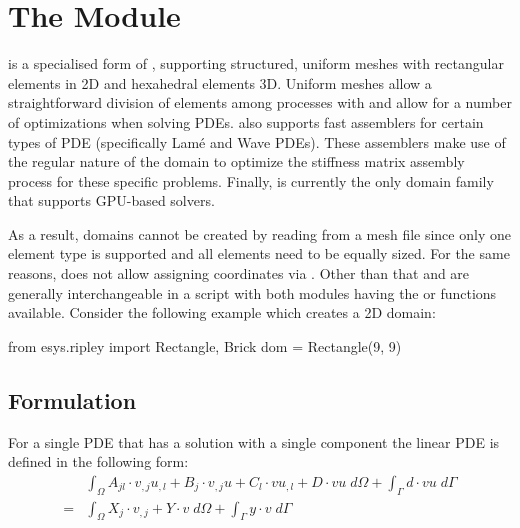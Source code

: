 
%
%
%

\chapter{The \ripley Module}\label{chap:ripley}

\ripley is a specialised form of \finley, supporting structured, 
uniform meshes with rectangular elements in 2D and hexahedral elements 3D.
Uniform meshes allow a straightforward division of elements among processes
with \MPI and allow for a number of optimizations when solving PDEs.
\ripley also supports fast assemblers for certain types of PDE (specifically
Lam\'e and Wave PDEs).
These assemblers make use of the regular nature of the domain to optimize the
stiffness matrix assembly process for these specific problems.
Finally, \ripley is currently the only domain family that supports GPU-based
solvers.

As a result, \ripley domains cannot be created by reading from a mesh file
since only one element type is supported and all elements need to be equally
sized.
For the same reasons, \ripley does not allow assigning coordinates via
.
Other than that \ripley and \finley are generally interchangeable in a script
with both modules having the  or  functions
available. Consider the following example which creates a 2D \ripley domain:

\begin{python}
 from esys.ripley import Rectangle, Brick
 dom = Rectangle(9, 9)
\end{python}

\section{Formulation}
For a single PDE that has a solution with a single component the linear PDE is
defined in the following form:
\begin{equation}\label{eq:ripleysingle}
\begin{array}{cl} &
\displaystyle{
\int_{\Omega}
A_{jl} \cdot v_{,j}u_{,l}+ B_{j} \cdot v_{,j} u+ C_{l} \cdot v u_{,l}+D \cdot vu \; d\Omega }
+ \displaystyle{\int_{\Gamma} d \cdot vu \; d{\Gamma} }\\
= & \displaystyle{\int_{\Omega}  X_{j} \cdot v_{,j}+ Y \cdot v \; d\Omega }
+ \displaystyle{\int_{\Gamma} y \cdot v \; d{\Gamma}}
\end{array}
\end{equation}


